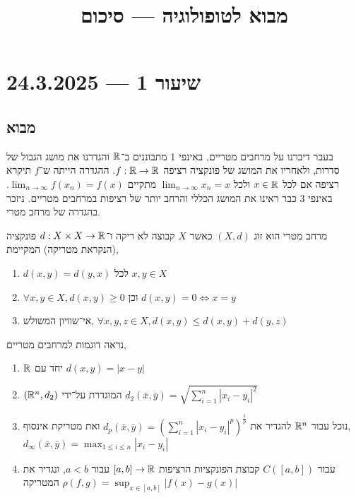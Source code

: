 
\title{מבוא לטופולוגיה --- סיכום}
\setcounter{secnumdepth}{2}

\usepackage{fancyhdr}
\pagestyle{fancy}
\renewcommand{\headrulewidth}{0pt}


\maketitle
\maketitleprint{}

\tableofcontents

\section{שיעור 1 --- 24.3.2025}
\subsection{מבוא}
בעבר דיברנו על מרחבים מטריים, באינפי 1 מתבוננים ב־$\mathbb{R}$ והגדרנו את מושג הגבול של סדרות, ולאחריו את המושג של פונקציה רציפה $f : \mathbb{R} \to \mathbb{R}$.
ההגדרה הייתה ש־$f$ תיקרא רציפה אם לכל $x \in \mathbb{R}$ ולכל $\lim_{n \to \infty} x_n = x$ מתקיים $\lim_{n \to \infty} f(x_n) = f(x)$.
באינפי 3 כבר ראינו את המושג הכללי והרחב יותר של רציפות במרחבים מטריים.
ניזכר בהגדרה של מרחב מטרי.
\begin{definition}
	מרחב מטרי הוא זוג $(X, d)$ כאשר $X$ קבוצה לא ריקה ו־$d : X \times X \to \mathbb{R}$ פונקציה (הנקראת מטריקה) המקיימת,
	\begin{enumerate}
		\item $d(x, y) = d(y, x)$ לכל $x, y \in X$
		\item $\forall x, y \in X, d(x, y) \ge 0$ וכן $d(x, y) = 0 \iff x = y$
		\item אי־שוויון המשולש, $\forall x, y, z \in X, d(x, y) \le d(x, y) + d(y, z)$
	\end{enumerate}
\end{definition}
\begin{example}
	נראה דוגמות למרחבים מטריים,
	\begin{enumerate}
		\item $\mathbb{R}$ יחד עם $d(x, y) = |x - y|$
		\item $(\mathbb{R}^n, d_2)$ המוגדרת על־ידי $d_2(\bar{x}, \bar{y}) = \sqrt{\sum_{i = 1}^{n} {|x_i - y_i|}^2}$
		\item נוכל עבור $\mathbb{R}^n$ להגדיר את $d_p(\bar{x}, \bar{y}) = {(\sum_{i = 1}^{n} {|x_i - y_i|}^p)}^\frac{1}{p}$ ואת מטריקת אינסוף, $d_\infty(\bar{x}, \bar{y}) = \max_{1 \le i \le n} |x_i - y_i|$
		\item עבור $C([a, b])$ קבוצת הפונקציות הרציפות $[a, b] \to \mathbb{R}$ עבור $a < b$, ונגדיר את המטריקה $\rho(f, g) = \sup_{x \in [a, b]} |f(x) - g(x)|$
	\end{enumerate}
\end{example}
